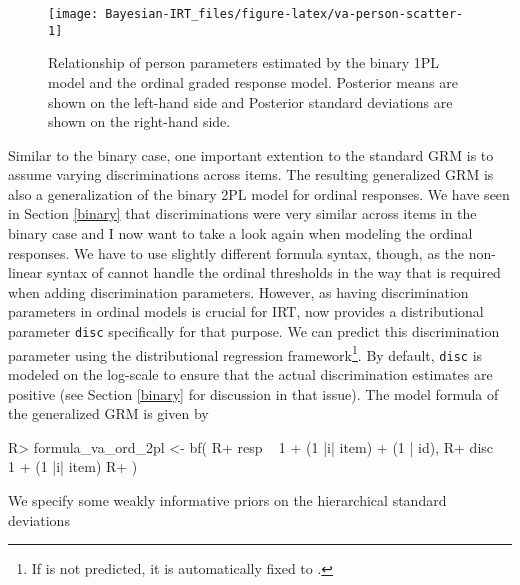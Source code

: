 \documentclass[jss]{jss}
\begin{document}
\begin{CodeChunk}
\begin{figure}

{\centering \texttt{[image: Bayesian-IRT\_files/figure-latex/va-person-scatter-1]} 

}

\caption[Relationship of person parameters estimated by the binary 1PL model and the ordinal graded response model]{Relationship of person parameters estimated by the binary 1PL model and the ordinal graded response model. Posterior means are shown on the left-hand side and Posterior standard deviations are shown on the right-hand side.}\label{fig:va-person-scatter}
\end{figure}
\end{CodeChunk}

Similar to the binary case, one important extention to the standard GRM
is to assume varying discriminations across items. The resulting
generalized GRM is also a generalization of the binary 2PL model for
ordinal responses. We have seen in Section \ref{binary} that
discriminations were very similar across items in the binary case and I
now want to take a look again when modeling the ordinal responses. We
have to use slightly different formula syntax, though, as the non-linear
syntax of  cannot handle the ordinal thresholds in the way
that is required when adding discrimination parameters. However, as
having discrimination parameters in ordinal models is crucial for IRT,
 now provides a distributional parameter \texttt{disc}
specifically for that purpose. We can predict this discrimination
parameter using the distributional regression
framework\footnote{If  is not predicted, it is automatically fixed to
.}. By default, \texttt{disc} is modeled on the log-scale to
ensure that the actual discrimination estimates are positive (see
Section \ref{binary} for discussion in that issue). The model formula of
the generalized GRM is given by

\begin{CodeChunk}

\begin{CodeInput}
R> formula_va_ord_2pl <- bf(
R+   resp ~ 1 + (1 |i| item) + (1 | id),
R+   disc ~ 1 + (1 |i| item)    
R+ )
\end{CodeInput}
\end{CodeChunk}

We specify some weakly informative priors on the hierarchical standard
deviations
\end{document}
